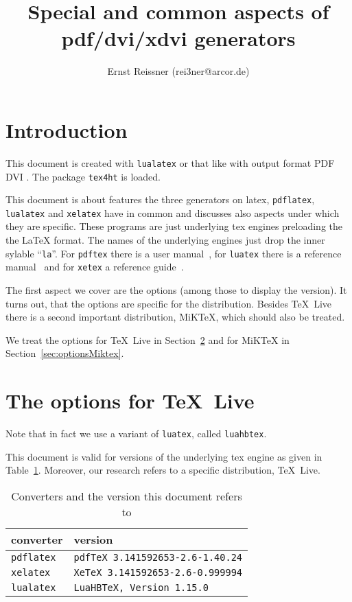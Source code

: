 \documentclass{article}
\title{Special and common aspects of pdf/dvi/xdvi generators }
\author{Ernst Reissner (rei3ner@arcor.de)}
\date{}
\newcommand{\pdflatex}{\texttt{pdflatex}}
\newcommand{\lualatex}{\texttt{lualatex}}
\newcommand{\xelatex}{\texttt{xelatex}}
\newcommand{\texlive}{\TeX~Live}
\newcommand{\miktex}{MiKTeX}
\begin{document}
\maketitle
\tableofcontents
\listoftables

\section{Introduction}

This document is created with \lualatex{} or that like 
with output format 
\ifpdf%
PDF%
\else
DVI%
\fi.
The package \texttt{tex4ht} 
is  loaded. 

This document is about features the three generators on latex, 
\pdflatex, \lualatex{} and \xelatex{} have in common 
and discusses also aspects under which they are specific. 
These programs are just underlying tex engines preloading the the \LaTeX{} format. 
The names of the underlying engines just drop the inner sylable ``\texttt{la}''. 
For \texttt{pdftex} there is a user manual~\cite{PdfTexUsr}, 
for \texttt{luatex} there is a reference manual~\cite{LuaTexRef} and 
for \texttt{xetex} a reference guide~\cite{XeTexRef}. 

The first aspect we cover are the options (among those to display the version). 
It turns out, that the options are specific for the distribution. 
Besides \texlive{} there is a second important distribution, \miktex, 
which should also be treated. 





We treat the options for \texlive{} in Section~\ref{sec:optionsTexlive} 
and for \miktex{} in Section~\ref{sec:optionsMiktex}. 

\section{The options for \texlive}\label{sec:optionsTexlive}


Note that in fact we use a variant of \texttt{luatex}, called \texttt{luahbtex}. 

This document is valid for versions of the underlying tex engine 
as given in Table~\ref{tab:versions}. 
Moreover, our research refers to a specific distribution, \texlive. 


\begin{longtable}{|ll|}
  \toprule
  converter & version \\
  \midrule
  \midrule
  \endfirsthead%
  \bottomrule
  \caption{\label{tab:versions} Converters and the version this document refers to }
  \endlastfoot%
  \pdflatex{}  & \texttt{pdfTeX 3.141592653-2.6-1.40.24} \\%
  \xelatex{}   & \texttt{XeTeX 3.141592653-2.6-0.999994} \\%
  \lualatex{}  & \texttt{LuaHBTeX, Version 1.15.0} \\
\end{longtable}
\end{document}
